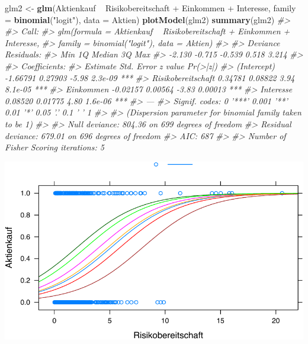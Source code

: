 \documentclass[12pt,ngerman,]{book}
\newenvironment{Shaded}{\begin{snugshade}}{\end{snugshade}}
\newcommand{\KeywordTok}[1]{\textcolor[rgb]{0.13,0.29,0.53}{\textbf{{#1}}}}
\newcommand{\DataTypeTok}[1]{\textcolor[rgb]{0.13,0.29,0.53}{{#1}}}
\newcommand{\StringTok}[1]{\textcolor[rgb]{0.31,0.60,0.02}{{#1}}}
\newcommand{\CommentTok}[1]{\textcolor[rgb]{0.56,0.35,0.01}{\textit{{#1}}}}
\newcommand{\NormalTok}[1]{{#1}}
\renewenvironment{Shaded}{\begin{kframe}}{\end{kframe}}
\begin{document}
\begin{Shaded}
\begin{Highlighting}[]
\NormalTok{glm2 <-}\StringTok{ }\KeywordTok{glm}\NormalTok{(Aktienkauf ~}\StringTok{ }\NormalTok{Risikobereitschaft +}\StringTok{ }\NormalTok{Einkommen +}\StringTok{ }\NormalTok{Interesse, }
            \DataTypeTok{family =} \KeywordTok{binomial}\NormalTok{(}\StringTok{"logit"}\NormalTok{), }\DataTypeTok{data =} \NormalTok{Aktien)}
\KeywordTok{plotModel}\NormalTok{(glm2)}
\KeywordTok{summary}\NormalTok{(glm2)}
\CommentTok{#> }
\CommentTok{#> Call:}
\CommentTok{#> glm(formula = Aktienkauf ~ Risikobereitschaft + Einkommen + Interesse, }
\CommentTok{#>     family = binomial("logit"), data = Aktien)}
\CommentTok{#> }
\CommentTok{#> Deviance Residuals: }
\CommentTok{#>    Min      1Q  Median      3Q     Max  }
\CommentTok{#> -2.130  -0.715  -0.539   0.518   3.214  }
\CommentTok{#> }
\CommentTok{#> Coefficients:}
\CommentTok{#>                    Estimate Std. Error z value Pr(>|z|)    }
\CommentTok{#> (Intercept)        -1.66791    0.27903   -5.98  2.3e-09 ***}
\CommentTok{#> Risikobereitschaft  0.34781    0.08822    3.94  8.1e-05 ***}
\CommentTok{#> Einkommen          -0.02157    0.00564   -3.83  0.00013 ***}
\CommentTok{#> Interesse           0.08520    0.01775    4.80  1.6e-06 ***}
\CommentTok{#> ---}
\CommentTok{#> Signif. codes:  0 '***' 0.001 '**' 0.01 '*' 0.05 '.' 0.1 ' ' 1}
\CommentTok{#> }
\CommentTok{#> (Dispersion parameter for binomial family taken to be 1)}
\CommentTok{#> }
\CommentTok{#>     Null deviance: 804.36  on 699  degrees of freedom}
\CommentTok{#> Residual deviance: 679.01  on 696  degrees of freedom}
\CommentTok{#> AIC: 687}
\CommentTok{#> }
\CommentTok{#> Number of Fisher Scoring iterations: 5}
\end{Highlighting}
\end{Shaded}

\begin{center}\includegraphics[width=0.7\linewidth]{072_klassifizierende_Regression_files/figure-latex/glm2_tips-1} \end{center}
\end{document}
